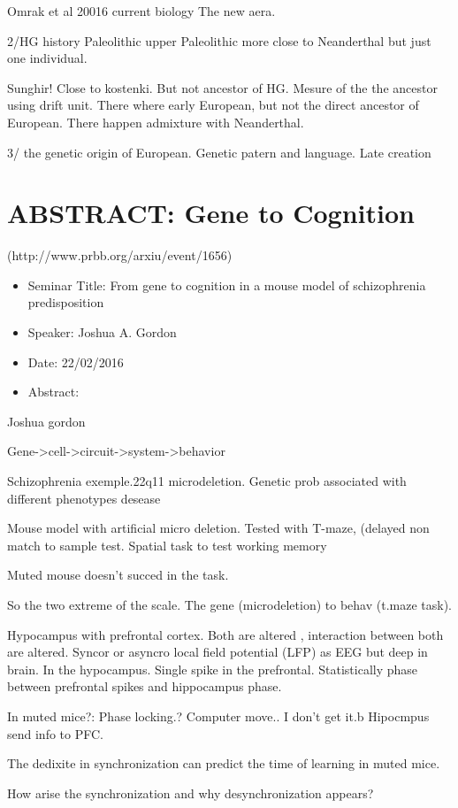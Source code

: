 \documentclass[10pt,letterpaper]{article}
\begin{document}
Omrak et al 20016 current biology
The new aera.

2/HG history Paleolithic upper Paleolithic more close to Neanderthal but just one individual.

Sunghir!
Close to kostenki. But not ancestor of HG. Mesure of the the ancestor using drift unit.
There where early European, but not the direct ancestor of European.
There happen admixture with Neanderthal.

3/ the genetic origin of European.
Genetic patern and language. Late creation


\section{ABSTRACT: Gene to Cognition}
(http://www.prbb.org/arxiu/event/1656)
\begin{itemize}
    \item Seminar Title: From gene to cognition in a mouse model of schizophrenia predisposition
    \item Speaker: Joshua A. Gordon
    \item Date: 22/02/2016
    \item Abstract:
\end{itemize}
Joshua gordon

Gene->cell->circuit->system->behavior

Schizophrenia exemple.22q11 microdeletion.
Genetic prob associated with different phenotypes desease

Mouse model with artificial micro deletion. Tested with T-maze, (delayed non match to sample test. Spatial task to test working memory

Muted mouse doesn't succed in the task.

So the two extreme of the scale. The gene (microdeletion) to behav (t.maze task).

Hypocampus with prefrontal cortex. Both are altered , interaction between both are altered.
Syncor or asyncro local field potential (LFP) as EEG but deep in brain. In the hypocampus. Single spike in the prefrontal.
Statistically phase between prefrontal spikes and hippocampus phase.

In muted mice?:
Phase locking.? Computer move.. I don't get it.b
Hipocmpus send info to PFC.

The dedixite in synchronization can predict the time of learning in muted mice.

How arise the synchronization and why desynchronization appears?
\end{document}
